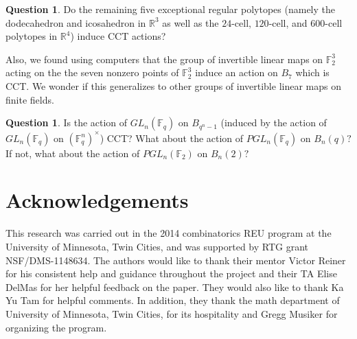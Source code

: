 \documentclass[10 pt]{amsart}
\theoremstyle{plain}
\theoremstyle{definition}
\newtheorem{question}[thm]{Question}
\theoremstyle{remark}
\numberwithin{equation}{section}
\newcommand\BF{{\mathbb F}}
\newcommand\BR{{\mathbb R}}
\begin{document}
\begin{question}
\label{question:exceptional_polytopes_cct}
Do the remaining five exceptional regular polytopes (namely the dodecahedron and icosahedron in $\BR^3$ as well as the $24$-cell, $120$-cell, and $600$-cell polytopes in $\BR^4$) induce CCT actions?
\end{question}

Also, we found using computers that the group of invertible linear maps on $\BF_2^3$ acting on the the seven nonzero points of $\BF_2^3$ induce an action on $B_7$ which is CCT. We wonder if this generalizes to other groups of invertible linear maps on finite fields.

\begin{question}
Is the action of $GL_n(\BF_q)$ on $B_{q^n-1}$ (induced by the action of $GL_n(\BF_q)$ on $(\BF_q^n)^\times$) CCT? What about the action of $PGL_n(\BF_q)$ on $B_n(q)?$ If not, what about the action of $PGL_n(\BF_2)$ on $B_n(2)?$ 
\end{question}

\section*{Acknowledgements}
This research was carried out in the 2014 combinatorics REU program at the University of Minnesota, Twin Cities, and was supported by RTG grant NSF/DMS-1148634.
The authors would like to thank their mentor Victor Reiner for his consistent help and guidance throughout the project and their TA Elise DelMas for her helpful feedback on the paper. They would also like to thank Ka Yu Tam for helpful comments.  In addition, they thank the math department of University of Minnesota, Twin Cities, for its hospitality and Gregg Musiker for organizing the program.



\end{document}
